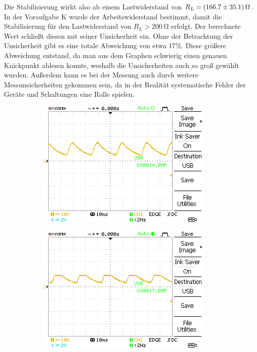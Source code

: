 \documentclass{article}
\theoremstyle{definition}
\begin{document}
Die Stabilisierung wirkt also ab einem Lastwiderstand von $R_L = \SI{166.7\pm 35.1}{\ohm}$. In der Voraufgabe K wurde der Arbeitswiderstand bestimmt, damit die Stabilisierung für den Lastwiderstand von $R_L > \SI{200}{\ohm}$ erfolgt. Der berechnete Wert schließt diesen mit seiner Unsicherheit ein. Ohne der Betrachtung der Unsicherheit gibt es eine totale Abweichung von etwa $17\%$. Diese größere Abweichung entstand, da man aus dem Graphen schwierig einen genauen Knickpunkt ablesen konnte, weshalb die Unsicherheiten auch so groß gewählt wurden. Außerdem kann es bei der Messung auch durch weitere Messunsicherheiten gekommen sein, da in der Realität systematische Fehler der Geräte und Schaltungen eine Rolle spielen.


\begin{figure}[h!]
    \centering
    \begin{subfigure}[b]{0.45\textwidth}
        \includegraphics[width=\textwidth]{MesswerteVersuch2/DS0014.png}
    \end{subfigure}
    \hfill
    \begin{subfigure}[b]{0.45\textwidth}
        \includegraphics[width=\textwidth]{MesswerteVersuch2/DS0017.png}
      

\end{subfigure}
\end{figure}
\end{document}
